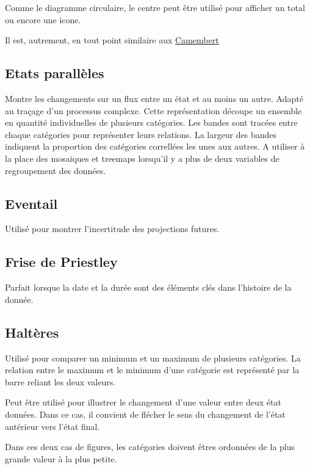 \documentclass[a4paper,12pt]{article}
\begin{document}
\begin{multicols}{2}
Comme le diagramme circulaire, le centre peut être utilisé pour afficher un total ou encore une icone. \autocite{alansmithLexiqueVisuel}

Il est, autrement, en tout point similaire aux \hyperref[sec:orgd10b1ed]{Camembert}
\subsection*{Etats parallèles}
\label{sec:orge807142}
Montre les changements sur un flux entre un état et au moins un autre. Adapté au traçage d'un processus complexe. \autocite{alansmithLexiqueVisuel}
Cette représentation découpe un ensemble en quantité individuelles de plusieurs catégories. Les bandes sont tracées entre chaque catégories pour représenter leurs relations. La largeur des bandes indiquent la proportion des catégories correllées les unes aux autres. \autocite{wilkeVisualizingNestedProportions2019}
A utiliser à la place des mosaiques et treemaps lorsqu'il y a plus de deux variables de regroupement des données. \autocite{wilkeDirectoryVisualizations2019}
\subsection*{Eventail}
\label{sec:orgbe77cc3}
Utilisé pour montrer l'incertitude des projections futures. \autocite{alansmithLexiqueVisuel}
\subsection*{Frise de Priestley}
\label{sec:org8aead60}
Parfait lorsque la date et la durée sont des éléments clés dans l'histoire de la donnée. \autocite{alansmithLexiqueVisuel}
\subsection*{Haltères}
\label{sec:org3d4faff}
Utilisé pour comparer un minimum et un maximum de plusieurs catégories. \autocite{alansmithLexiqueVisuel} La relation entre le maximum et le minimum d'une catégorie est représenté par la barre reliant les deux valeurs. \autocite{mikeyiHowChooseRight2020}

Peut être utilisé pour illustrer le changement d'une valeur entre deux état données. Dans ce cas, il convient de flécher le sens du changement de l'état antérieur vers l'état final.

Dans ces deux cas de figures, les catégories doivent êtres ordonnées de la plus grande valeur à la plus petite.


\end{multicols}
\end{document}
